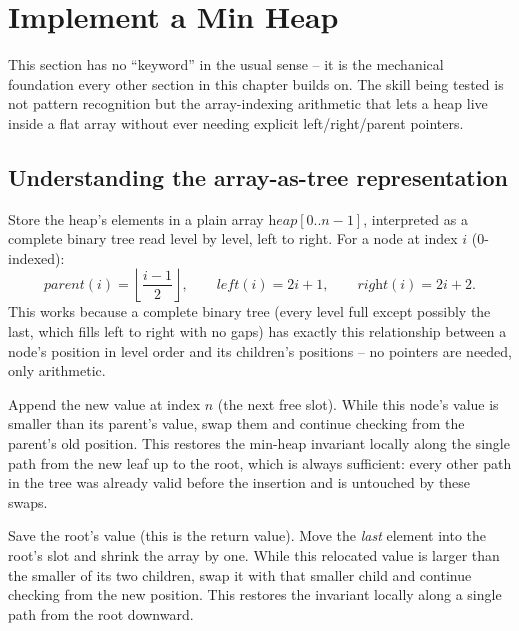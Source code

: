 \section{Implement a Min Heap}
\label{sec:heap-implement}


\begin{patternbox}
This section has no ``keyword'' in the usual sense -- it is the mechanical
foundation every other section in this chapter builds on. The skill being
tested is not pattern recognition but the array-indexing arithmetic that
lets a heap live inside a flat array without ever needing explicit
left/right/parent pointers.
\end{patternbox}

\subsection*{Understanding the array-as-tree representation}

Store the heap's elements in a plain array $\textit{heap}[0..n-1]$,
interpreted as a complete binary tree read level by level, left to right.
For a node at index $i$ (0-indexed):
\[
  \textit{parent}(i) = \left\lfloor \frac{i-1}{2} \right\rfloor, \qquad
  \textit{left}(i) = 2i+1, \qquad \textit{right}(i) = 2i+2.
\]
This works because a complete binary tree (every level full except
possibly the last, which fills left to right with no gaps) has exactly
this relationship between a node's position in level order and its
children's positions -- no pointers are needed, only arithmetic.

\begin{ideabox}
Append the new value at index $n$ (the next free slot). While this node's
value is smaller than its parent's value, swap them and continue checking
from the parent's old position. This restores the min-heap invariant
locally along the single path from the new leaf up to the root, which is
always sufficient: every other path in the tree was already valid before
the insertion and is untouched by these swaps.
\end{ideabox}

\begin{ideabox}
Save the root's value (this is the return value). Move the \emph{last}
element into the root's slot and shrink the array by one. While this
relocated value is larger than the smaller of its two children, swap it
with that smaller child and continue checking from the new position. This
restores the invariant locally along a single path from the root downward.
\end{ideabox}

